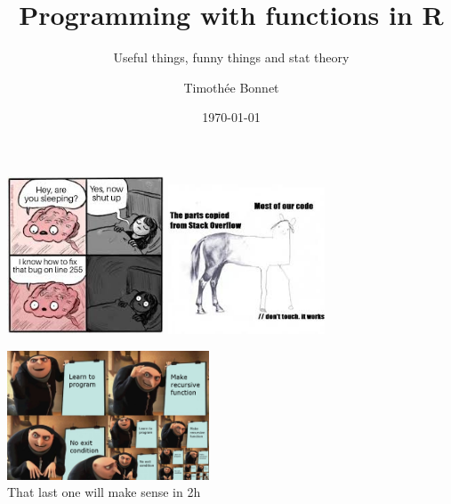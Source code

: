 \documentclass{beamer}\usepackage[]{graphicx}\usepackage[]{color}
\title{Programming with functions in R}
\subtitle{Useful things, funny things and stat theory}
\author{Timoth\'ee Bonnet}
\date{\today}
\begin{document}


\begin{frame}{}%
\centering
\includegraphics[width=0.35\textwidth]{figures/images.jpeg}
\includegraphics[width=0.35\textwidth]{figures/images2.jpeg}

\includegraphics[width=0.45\textwidth]{figures/recursive}\\ That last one will make sense in 2h
\end{frame}

\begin{frame}
  \maketitle
\end{frame}
\end{document}
